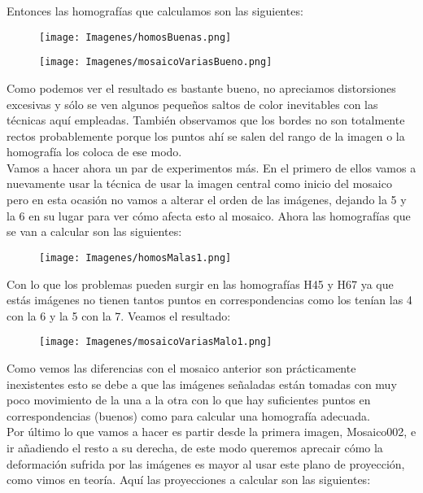 \documentclass[10pt,a4paper]{article}
\begin{document}
Entonces las homografías que calculamos son las siguientes:\\

\begin{figure}[H]
\centering
\texttt{[image: Imagenes/homosBuenas.png]}
\end{figure}

\begin{figure}[H]
\centering
\texttt{[image: Imagenes/mosaicoVariasBueno.png]}
\end{figure}

Como podemos ver el resultado es bastante bueno, no apreciamos distorsiones excesivas y sólo se ven algunos pequeños saltos de color inevitables con las técnicas aquí empleadas. También observamos que los bordes no son totalmente rectos probablemente porque los puntos ahí se salen del rango de la imagen o la homografía los coloca de ese modo.\\

Vamos a hacer ahora un par de experimentos más. En el primero de ellos vamos a nuevamente usar la técnica de usar la imagen central como inicio del mosaico pero en esta ocasión no vamos a alterar el orden de las imágenes, dejando la 5 y la 6 en su lugar para ver cómo afecta esto al mosaico. Ahora las homografías que se van a calcular son las siguientes:\\

\begin{figure}[H]
\centering
\texttt{[image: Imagenes/homosMalas1.png]}
\end{figure}

Con lo que los problemas pueden surgir en las homografías H45 y H67 ya que estás imágenes no tienen tantos puntos en correspondencias como los tenían las 4 con la 6 y la 5 con la 7. Veamos el resultado:\\

\begin{figure}[H]
\centering
\texttt{[image: Imagenes/mosaicoVariasMalo1.png]}
\end{figure}

Como vemos las diferencias con el mosaico anterior son prácticamente inexistentes esto se debe a que las imágenes señaladas están tomadas con muy poco movimiento de la una a la otra con lo que hay suficientes puntos en correspondencias (buenos) como para calcular una homografía adecuada.\\

Por último lo que vamos a hacer es partir desde la primera imagen, Mosaico002, e ir añadiendo el resto a su derecha, de este modo queremos aprecair cómo la deformación sufrida por las imágenes es mayor al usar este plano de proyección, como vimos en teoría. Aquí las proyecciones a calcular son las siguientes:\\
\end{document}
